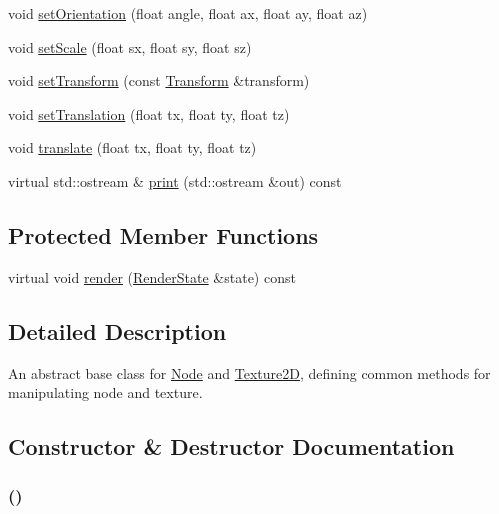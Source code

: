 \begin{CompactItemize}
void \hyperlink{classm3g_1_1Transformable_980a9a2b5f6102763042e616d3aa4606}{setOrientation} (float angle, float ax, float ay, float az)
\item 
void \hyperlink{classm3g_1_1Transformable_937d04042c25021532ea2532fe5e3a32}{setScale} (float sx, float sy, float sz)
\item 
void \hyperlink{classm3g_1_1Transformable_05052269aaf19775f3ff1a10d042777e}{setTransform} (const \hyperlink{classm3g_1_1Transform}{Transform} \&transform)
\item 
void \hyperlink{classm3g_1_1Transformable_afd728a7db85b8e12bdafc2b3c08a515}{setTranslation} (float tx, float ty, float tz)
\item 
void \hyperlink{classm3g_1_1Transformable_66d493b8307a85e615c4eb89116f2e09}{translate} (float tx, float ty, float tz)
\item 
virtual std::ostream \& \hyperlink{classm3g_1_1Transformable_6fea17fa1532df3794f8cb39cb4f911f}{print} (std::ostream \&out) const 
\end{CompactItemize}
\subsection*{Protected Member Functions}
\begin{CompactItemize}
\item 
virtual void \hyperlink{classm3g_1_1Transformable_8babc8a79b78615da51161e94029eea9}{render} (\hyperlink{structm3g_1_1RenderState}{RenderState} \&state) const 
\end{CompactItemize}


\subsection{Detailed Description}
An abstract base class for \hyperlink{classm3g_1_1Node}{Node} and \hyperlink{classm3g_1_1Texture2D}{Texture2D}, defining common methods for manipulating node and texture. 

\subsection{Constructor \& Destructor Documentation}
\hypertarget{classm3g_1_1Transformable_ca6563203e3e883391c9d0927028aa04}{
\subsubsection[{Transformable}]{ ()}}
\label{classm3g_1_1Transformable_ca6563203e3e883391c9d0927028aa04}


